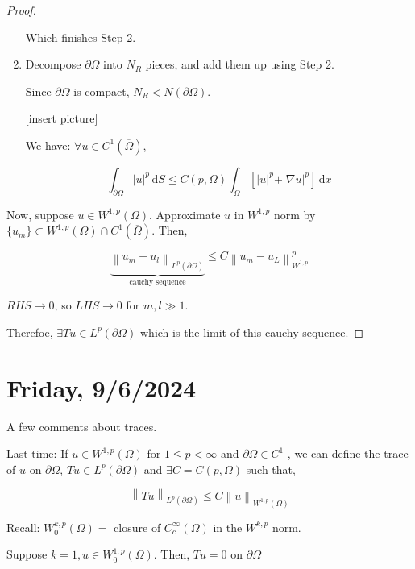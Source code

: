 \documentclass{article}
\theoremstyle{definition}
\begin{document}
\begin{proof}
\begin{enumerate}[label=\arabic*)]
        Which finishes Step 2.

        \item Decompose \(\partial \Omega\) into \(N_R\) pieces, and add them up using Step 2.
        
        Since \(\partial \Omega\) is compact, \(N_R < N(\partial \Omega)\).
        
        [insert picture]

        We have: \(\forall u\in C^1(\overline{\Omega})\),

        \[
            \int_{\partial \Omega}^{} \vert u \vert ^ p \,\mathrm{d}S \leq C(p,\Omega) \int_{\Omega}^{} \left[ \vert u \vert ^ p + \vert \nabla u \vert ^ p \right]  \,\mathrm{d}x 
        \]

    \end{enumerate} 

    Now, suppose \(u \in W^{1,p}(\Omega)\). Approximate \(u\) in \(W^{1,p}\) norm by \(\{ u_m \} \subset W^{1,p}(\Omega) \cap C^1(\overline{\Omega} )\). Then,

    \[
        \underbrace{\left\lVert u_m - u_l \right\rVert _{L^p(\partial \Omega)}}_{\text{cauchy sequence} } \leq C \left\lVert u_m - u_L \right\rVert ^ p _{W^{1,p}}
    \]

    \(RHS \to 0\), so \(LHS \to 0\) for \(m, l \gg 1\).

    Therefoe, \(\exists T u \in L^p(\partial \Omega)\) which is the limit of this cauchy sequence.

\end{proof}

\section*{Friday, 9/6/2024}

A few comments about traces.

Last time: If \(u \in W^{1,p}(\Omega)\) for \(1 \leq p < \infty\) and \(\partial \Omega \in C^1\) , we can define the trace of \(u\) on \(\partial \Omega\), \(Tu \in L^p(\partial \Omega)\) and \(\exists C = C(p, \Omega)\) such that,

\[
    \left\lVert T u \right\rVert _{L^p(\partial \Omega)} \leq C \left\lVert u \right\rVert _{W^{1,p}(\Omega)}
\]

Recall: \(W^{k,p}_0(\Omega) =\) closure of \(C_c^{\infty}(\Omega)\) in the \(W^{k,p}\) norm.

Suppose \(k = 1, u \in W^{1,p}_0(\Omega)\). Then, \(Tu = 0\) on \(\partial \Omega\) 
\end{document}
